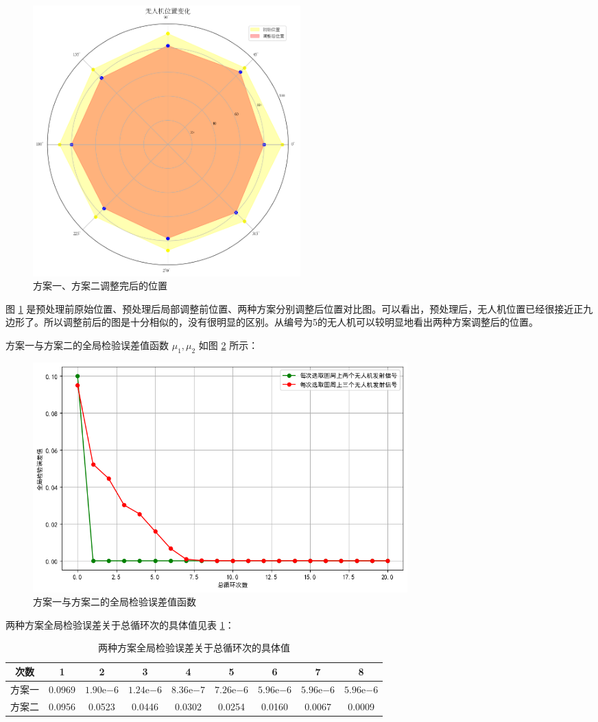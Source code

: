 \documentclass[withoutpreface,bwprint]{cumcmthesis} %
\begin{document}
\begin{figure}[H]
  \centering
  \includegraphics[width=0.5\textwidth]{../../figure/q3_3.png} %
  \caption{方案一、方案二调整完后的位置}
  \label{q3_3}
\end{figure}

图 \ref{q3_3} 是预处理前原始位置、预处理后局部调整前位置、两种方案分别调整后位置对比图。可以看出，预处理后，无人机位置已经很接近正九边形了。所以调整前后的图是十分相似的，没有很明显的区别。从编号为5的无人机可以较明显地看出两种方案调整后的位置。

方案一与方案二的全局检验误差值函数 \( \mu_1, \mu_2 \) 如图 \ref{q3_4} 所示：

\begin{figure}[H]
  \centering
  \includegraphics[width=0.7\textwidth]{../../figure/q3_4.png} %
  \caption{方案一与方案二的全局检验误差值函数}
  \label{q3_4}
\end{figure}

两种方案全局检验误差关于总循环次的具体值见表 \ref{tab:error_cycle}：

\begin{table}[H]
  \centering
  \caption{两种方案全局检验误差关于总循环次的具体值}
  \label{tab:error_cycle}
  \begin{tabular}{ccccccccc}
    \toprule
    次数 & 1 & 2 & 3 & 4 & 5 & 6 & 7 & 8 \\
    \midrule
    方案一 & 0.0969 & $1.90\mathrm{e}{-6}$ & $1.24\mathrm{e}{-6}$ & $8.36\mathrm{e}{-7}$ & $7.26\mathrm{e}{-6}$ & $5.96\mathrm{e}{-6}$ & $5.96\mathrm{e}{-6}$ & $5.96\mathrm{e}{-6}$ \\
    方案二 & 0.0956 & 0.0523 & 0.0446 & 0.0302 & 0.0254 & 0.0160 & 0.0067 & 0.0009 \\
    \bottomrule
  \end{tabular}
\end{table}
\end{document}
